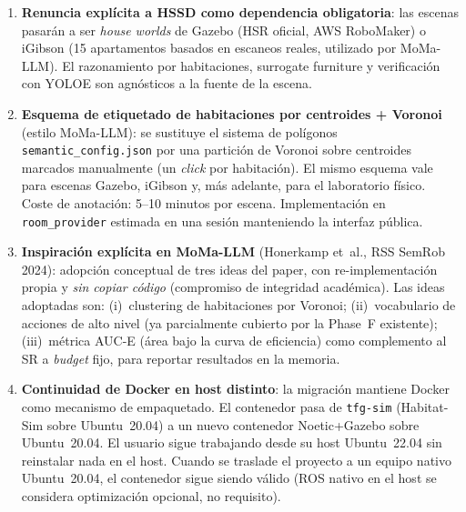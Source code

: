 \begin{enumerate}
  \item \textbf{Renuncia explícita a HSSD como dependencia obligatoria}: las
        escenas pasarán a ser \emph{house worlds} de Gazebo (HSR oficial,
        AWS RoboMaker) o iGibson (15 apartamentos basados en escaneos reales,
        utilizado por MoMa-LLM). El razonamiento por habitaciones, surrogate
        furniture y verificación con YOLOE son agnósticos a la fuente de la
        escena.

  \item \textbf{Esquema de etiquetado de habitaciones por centroides
        + Voronoi} (estilo MoMa-LLM): se sustituye el sistema de polígonos
        \texttt{semantic\_config.json} por una partición de Voronoi sobre
        centroides marcados manualmente (un \emph{click} por habitación). El
        mismo esquema vale para escenas Gazebo, iGibson y, más adelante, para
        el laboratorio físico. Coste de anotación: 5--10 minutos por escena.
        Implementación en \texttt{room\_provider} estimada en una sesión
        manteniendo la interfaz pública.

  \item \textbf{Inspiración explícita en MoMa-LLM} (Honerkamp et~al.,
        RSS SemRob 2024): adopción conceptual de tres ideas del paper, con
        re-implementación propia y \emph{sin copiar código} (compromiso de
        integridad académica). Las ideas adoptadas son: (i)~clustering de
        habitaciones por Voronoi; (ii)~vocabulario de acciones de alto nivel
        (ya parcialmente cubierto por la Phase~F existente); (iii)~métrica
        AUC-E (área bajo la curva de eficiencia) como complemento al SR a
        \emph{budget} fijo, para reportar resultados en la memoria.

  \item \textbf{Continuidad de Docker en host distinto}: la migración mantiene
        Docker como mecanismo de empaquetado. El contenedor pasa de
        \texttt{tfg-sim} (Habitat-Sim sobre Ubuntu~20.04) a un nuevo contenedor
        Noetic+Gazebo sobre Ubuntu~20.04. El usuario sigue trabajando desde su
        host Ubuntu~22.04 sin reinstalar nada en el host. Cuando se traslade el
        proyecto a un equipo nativo Ubuntu~20.04, el contenedor sigue siendo
        válido (ROS nativo en el host se considera optimización opcional, no
        requisito).

\end{enumerate}
